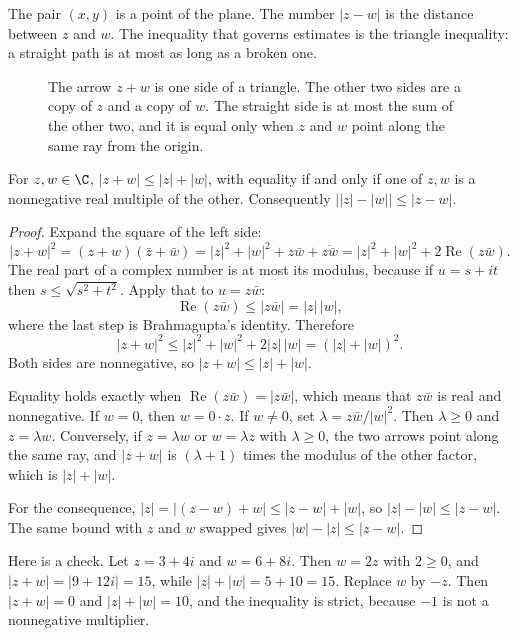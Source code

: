 The pair $(x,y)$ is a point of the plane. The number $|z-w|$ is the distance between $z$ and $w$. The inequality that governs estimates is the triangle inequality: a straight path is at most as long as a broken one.

\begin{figure}[ht]
\centering
{}
\caption{The arrow $z+w$ is one side of a triangle. The other two sides are a copy of $z$ and a copy of $w$. The straight side is at most the sum of the other two, and it is equal only when $z$ and $w$ point along the same ray from the origin.}
\label{fig:triangle}
\end{figure}

\begin{propositionx}
For $z,w\in\C$, $|z+w|\le|z|+|w|$, with equality if and only if one of $z,w$ is a nonnegative real multiple of the other. Consequently $\bigl||z|-|w|\bigr|\le|z-w|$.
\end{propositionx}
\begin{proof}
Expand the square of the left side:
\[
|z+w|^2=(z+w)(\bar z+\bar w)=|z|^2+|w|^2+z\bar w+\overline{z\bar w}=|z|^2+|w|^2+2\operatorname{Re}(z\bar w).
\]
The real part of a complex number is at most its modulus, because if $u=s+it$ then $s\le\sqrt{s^2+t^2}$. Apply that to $u=z\bar w$:
\[
\operatorname{Re}(z\bar w)\le|z\bar w|=|z|\,|w|,
\]
where the last step is Brahmagupta's identity. Therefore
\[
|z+w|^2\le|z|^2+|w|^2+2|z|\,|w|=(|z|+|w|)^2.
\]
Both sides are nonnegative, so $|z+w|\le|z|+|w|$.

Equality holds exactly when $\operatorname{Re}(z\bar w)=|z\bar w|$, which means that $z\bar w$ is real and nonnegative. If $w=0$, then $w=0\cdot z$. If $w\ne0$, set $\lambda=z\bar w/|w|^2$. Then $\lambda\ge0$ and $z=\lambda w$. Conversely, if $z=\lambda w$ or $w=\lambda z$ with $\lambda\ge0$, the two arrows point along the same ray, and $|z+w|$ is $(\lambda+1)$ times the modulus of the other factor, which is $|z|+|w|$.

For the consequence, $|z|=|(z-w)+w|\le|z-w|+|w|$, so $|z|-|w|\le|z-w|$. The same bound with $z$ and $w$ swapped gives $|w|-|z|\le|z-w|$.
\end{proof}

Here is a check. Let $z=3+4i$ and $w=6+8i$. Then $w=2z$ with $2\ge0$, and $|z+w|=|9+12i|=15$, while $|z|+|w|=5+10=15$. Replace $w$ by $-z$. Then $|z+w|=0$ and $|z|+|w|=10$, and the inequality is strict, because $-1$ is not a nonnegative multiplier.

